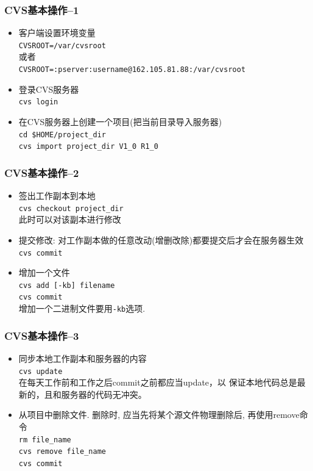 \documentclass[compress]{beamer}
\begin{document}
\begin{frame}[containsverbatim]
\frametitle{CVS基本操作--1}
\begin{itemize}
\item 客户端设置环境变量\\
\verb~CVSROOT=/var/cvsroot~\\
或者\\
{\small \verb~CVSROOT=:pserver:username@162.105.81.88:/var/cvsroot~}
\item 登录CVS服务器\\
\verb~cvs login~
\item 在CVS服务器上创建一个项目(把当前目录导入服务器)\\
\verb~cd $HOME/project_dir~\\
\verb~cvs import project_dir V1_0 R1_0~
\end{itemize}


\end{frame}

\begin{frame}[containsverbatim]
\frametitle{CVS基本操作--2}
\begin{itemize}
\item 签出工作副本到本地\\
\verb~cvs checkout project_dir~\\
此时可以对该副本进行修改
\item 提交修改: 对工作副本做的任意改动(增删改除)都要提交后才会在服务器生效\\
\verb~cvs commit~
\item 增加一个文件\\
\verb~cvs add [-kb] filename~\\
\verb~cvs commit~ \\
增加一个二进制文件要用\verb~-kb~选项.\\

\end{itemize}


\end{frame}

\begin{frame}[containsverbatim]
\frametitle{CVS基本操作--3}
\begin{itemize}
\item 同步本地工作副本和服务器的内容\\
\verb~cvs update~\\
在每天工作前和工作之后commit之前都应当update，以
保证本地代码总是最新的，且和服务器的代码无冲突。
\item 从项目中删除文件. 删除时, 应当先将某个源文件物理删除后, 再使用remove命令\\
\verb~rm file_name~\\
\verb~cvs remove file_name~\\
\verb~cvs commit~


\end{itemize}


\end{frame}
\end{document}
